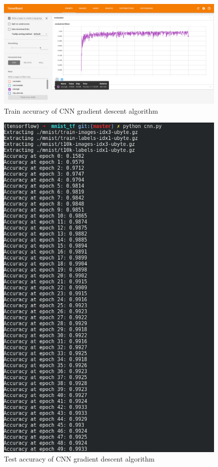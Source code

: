 \documentclass[10pt,twocolumn,letterpaper]{article}
\begin{document}
\begin{CJK}{UTF8}{gbsn}
\begin{figure}
\begin{center}
   \includegraphics[width=0.9\linewidth]{cnn_sgd1.png}
\end{center}
\caption{Train accuracy of CNN gradient descent algorithm}
\label{fig:cnn_sgd1}
\end{figure}

\begin{figure}
\begin{center}
   \includegraphics[width=0.9\linewidth]{cnn_sgd3.png}
\end{center}
\caption{Test accuracy of CNN gradient descent algorithm}
\label{fig:cnn_sgd3}
\end{figure}


\end{CJK}
\end{document}

